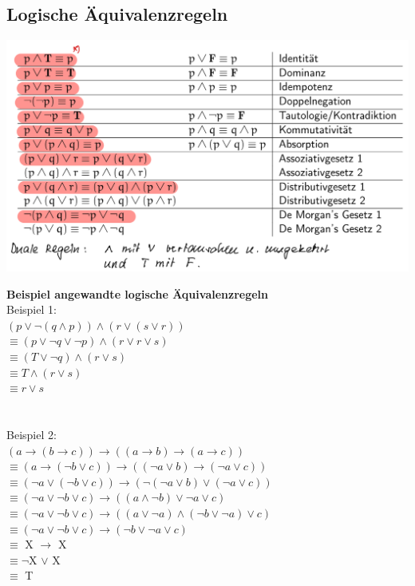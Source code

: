 \documentclass[12pt]{scrartcl}
\begin{document}
\subsection{Logische Äquivalenzregeln}
\includegraphics[width=14cm]{img/logic_equivalence_rules.png}

\newpage
\textbf{Beispiel angewandte logische Äquivalenzregeln}\\
Beispiel 1:\\
$\left(p \lor \lnot(q \land p)\right) \land \left(r \lor (s \lor r)\right)$\\
$\equiv (p \lor \lnot q \lor \lnot p) \land (r \lor r \lor s)$\\
$\equiv (T \lor \lnot q) \land (r \lor s)$\\
$\equiv T \land (r \lor s)$\\
$\equiv r \lor s$
 \\
 \\
 \\

Beispiel 2:\\
$(a \rightarrow (b \rightarrow c)) \rightarrow ((a \rightarrow b)\rightarrow (a \rightarrow c))$\\
$\equiv (a \rightarrow (\lnot b \lor c)) \rightarrow ((\lnot a \lor b) \rightarrow (\lnot a \lor c))$\\
$\equiv (\lnot a \lor (\lnot b \lor c)) \rightarrow (\lnot(\lnot a \lor b) \lor (\lnot a \lor c))$\\
$\equiv (\lnot a \lor \lnot b \lor c) \rightarrow ((a \land \lnot b) \lor \lnot a \lor c)$\\
$\equiv (\lnot a \lor \lnot b \lor c) \rightarrow ((a \lor \lnot a) \land (\lnot b \lor \lnot a) \lor c)$\\
$\equiv (\lnot a \lor \lnot b \lor c) \rightarrow (\lnot b \lor \lnot a \lor c)$\\
$\equiv$ X $\rightarrow$ X\\
$\equiv \lnot$X $\lor$ X\\
$\equiv$ T\\
\end{document}
